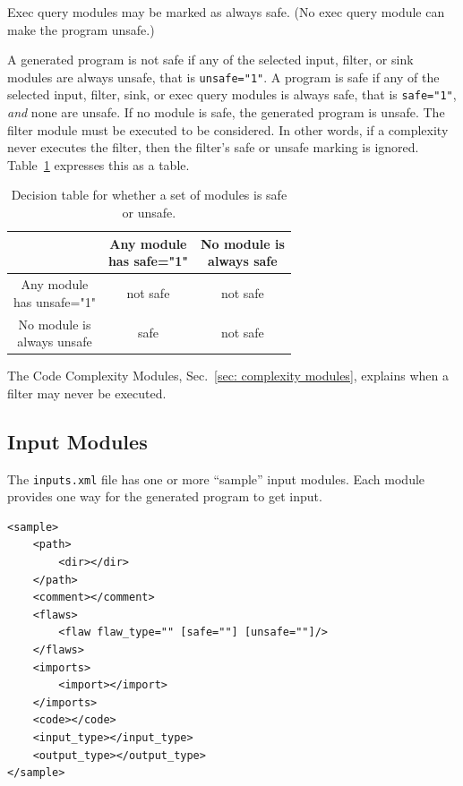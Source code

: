 \documentclass[12pt]{article}
\begin{document}
Exec query modules may be marked as always safe.  (No exec query module can make the
program unsafe.)

A generated program is not safe if any of the selected input, filter, or sink modules
are always unsafe, that is \verb|unsafe="1"|.  A program is safe if any of the
selected input, filter, sink, or exec query modules is always safe, that is
\verb|safe="1"|, \emph{and} none
are unsafe.  If no module is safe, the generated program is unsafe.
The filter module must be executed to be considered.  In other words, if
a complexity never executes the filter, then the filter's safe or unsafe marking is
ignored.  Table~\ref{tab:selection safe algorithm} expresses this as a table.

\begin{table}[H]
\centering
\caption{Decision table for whether a set of modules is safe or unsafe.}
\begin{tabular}{c|c|c|}
  & \makecell{Any module \\ has safe="1"}
  & \makecell{No module is \\ always safe} \\
\hline
\makecell{Any module \\ has unsafe="1"}  & not safe & not safe \\
\hline
\makecell{No module is \\ always unsafe} &   safe   & not safe \\
\hline
\end{tabular}
\label{tab:selection safe algorithm}
\end{table}

The Code Complexity Modules, Sec.~\ref{sec: complexity modules}, explains when a
filter may never be executed.


\subsection{Input Modules}
\label{sec: input module}

The \verb|inputs.xml| file has one or more ``sample'' input modules.  Each module
provides one way for the generated program to get input.

\begin{verbatim}
<sample>
    <path>
        <dir></dir>
    </path>
    <comment></comment>
    <flaws>
        <flaw flaw_type="" [safe=""] [unsafe=""]/>
    </flaws>
    <imports>
        <import></import>
    </imports>
    <code></code>
    <input_type></input_type>
    <output_type></output_type>
</sample>
\end{verbatim}
\end{document}
